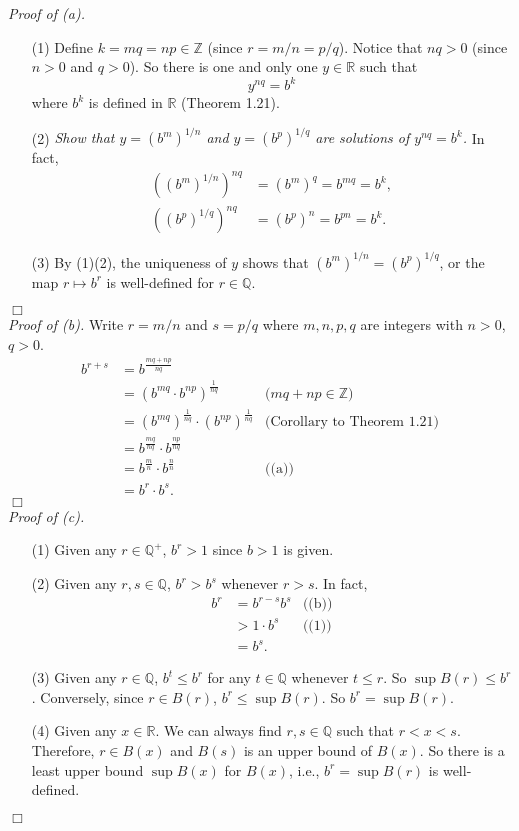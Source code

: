 \documentclass{article}
\begin{document}
\emph{Proof of (a).}
\begin{enumerate}
\item[(1)]
Define $k = mq = np \in \mathbb{Z}$ (since $r = m/n = p/q$).
Notice that $nq > 0$ (since $n>0$ and $q>0$).
So there is one and only one $y \in \mathbb{R}$ such that $$y^{nq} = b^k$$
where $b^k$ is defined in $\mathbb{R}$ (Theorem 1.21).
\item[(2)]
\emph{Show that $y = (b^m)^{1/n}$ and $y = (b^p)^{1/q}$
are solutions of $y^{nq} = b^k$.}
In fact,
\begin{align*}
((b^m)^{1/n})^{nq} &= (b^m)^q = b^{mq} = b^k, \\
((b^p)^{1/q})^{nq} &= (b^p)^n = b^{pn} = b^k.
\end{align*}
\item[(3)]
By (1)(2), the uniqueness of $y$ shows that $(b^m)^{1/n} = (b^p)^{1/q}$,
or the map $r \mapsto b^r$ is well-defined for $r \in \mathbb{Q}$.
\end{enumerate}
$\Box$ \\

\emph{Proof of (b).}
Write $r=m/n$ and $s=p/q$ where $m,n,p,q$ are integers with $n>0$, $q>0$.
\begin{align*}
b^{r+s}
&= b^{\frac{mq+np}{nq}} \\
&= (b^{mq} \cdot b^{np})^{\frac{1}{nq}}
  &\text{($mq+np \in \mathbb{Z}$)} \\
&= (b^{mq})^{\frac{1}{nq}} \cdot (b^{np})^{\frac{1}{nq}}
  &\text{(Corollary to Theorem 1.21)} \\
&= b^{\frac{mq}{nq}} \cdot b^{\frac{np}{nq}} \\
&= b^{\frac{m}{n}} \cdot b^{\frac{n}{n}}
  &\text{((a))} \\
&= b^r \cdot b^s.
\end{align*}
$\Box$ \\

\emph{Proof of (c).}
\begin{enumerate}
\item[(1)]
Given any $r \in \mathbb{Q}^+$, $b^r > 1$ since $b > 1$ is given.
\item[(2)]
Given any $r, s \in \mathbb{Q}$, $b^r > b^s$ whenever $r > s$.
In fact,
\begin{align*}
b^r
&= b^{r-s} b^s
  &\text{((b))} \\
&> 1 \cdot b^s
  &\text{((1))} \\
&= b^s.
\end{align*}
\item[(3)]
Given any $r \in \mathbb{Q}$, $b^t \leq b^r$ for any $t \in \mathbb{Q}$
whenever $t \leq r$.
So $\sup B(r) \leq b^r$.
Conversely, since $r \in B(r)$, $b^r \leq \sup B(r)$.
So $b^r = \sup B(r)$.
\item[(4)]
Given any $x \in \mathbb{R}$.
We can always find $r, s \in \mathbb{Q}$ such that $r < x < s$.
Therefore, $r \in B(x)$ and $B(s)$ is an upper bound of $B(x)$.
So there is a least upper bound $\sup B(x)$ for $B(x)$, i.e.,
$b^r = \sup B(r)$ is well-defined.
\end{enumerate}
$\Box$ \\
\end{document}
